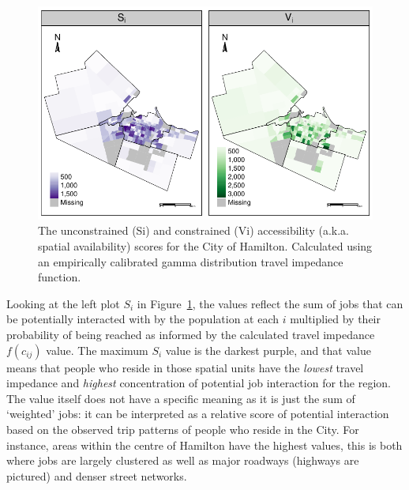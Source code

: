 \documentclass[12pt, oneside]{report}
\begin{document}
\begin{figure}

{\centering \includegraphics{tools-report_files/figure-pdf/fig-raw-con-and-unconstrained-access-1.pdf}

}

\caption{\label{fig-raw-con-and-unconstrained-access}The unconstrained
(Si) and constrained (Vi) accessibility (a.k.a. spatial availability)
scores for the City of Hamilton. Calculated using an empirically
calibrated gamma distribution travel impedance function.}

\end{figure}

Looking at the left plot \(S_i\) in
Figure~\ref{fig-raw-con-and-unconstrained-access}, the values reflect
the sum of jobs that can be potentially interacted with by the
population at each \(i\) multiplied by their probability of being
reached as informed by the calculated travel impedance \(f(c_{ij})\)
value. The maximum \(S_i\) value is the darkest purple, and that value
means that people who reside in those spatial units have the
\emph{lowest} travel impedance and \emph{highest} concentration of
potential job interaction for the region. The value itself does not have
a specific meaning as it is just the sum of `weighted' jobs: it can be
interpreted as a relative score of potential interaction based on the
observed trip patterns of people who reside in the City. For instance,
areas within the centre of Hamilton have the highest values, this is
both where jobs are largely clustered as well as major roadways
(highways are pictured) and denser street networks.
\end{document}

